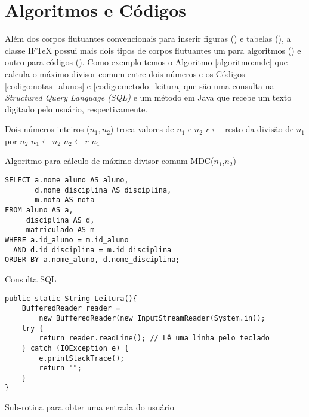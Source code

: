 \section{Algoritmos e Códigos} \label{secao:algoritmos_e_codigos}

Além dos corpos flutuantes convencionais para inserir figuras () e tabelas (), a classe {IF\TeX} possui mais dois tipos de corpos flutuantes um para algoritmos () e outro para códigos (). Como exemplo temos o Algoritmo \ref{algoritmo:mdc} que calcula o máximo divisor comum entre dois números e os Códigos \ref{codigo:notas_alunos} e \ref{codigo:metodo_leitura} que são uma consulta na \textit{Structured Query Language (SQL)} e um método em Java que recebe um texto digitado pelo usuário, respectivamente.

\begin{algoritmo}[!htb]
\begin{algorithmic}[1]
 \Require Dois números inteiros ($n_1, n_2$)
  
   \State troca valores de $n_1$ e $n_2$
 \EndIf
 \Repeat
   \State $r \leftarrow$ resto da divisão de $n_1$ por $n_2$
   \State $n_1 \leftarrow n_2$
   \State $n_2 \leftarrow r$
 \Return $n_1$
\end{algorithmic}
\caption{Algoritmo para cálculo de máximo divisor comum MDC($n_1$,$n_2$)} \label{algoritmo:mdc}
\end{algoritmo}

\begin{codigo}[!htb]
\begin{Verbatim}
SELECT a.nome_aluno AS aluno,
       d.nome_disciplina AS disciplina,
       m.nota AS nota
FROM aluno AS a,
     disciplina AS d,
     matriculado AS m
WHERE a.id_aluno = m.id_aluno
  AND d.id_disciplina = m.id_disciplina
ORDER BY a.nome_aluno, d.nome_disciplina;
\end{Verbatim}
\caption{Consulta SQL} \label{codigo:notas_alunos}
\end{codigo}

\begin{codigo}[!htb]
\begin{Verbatim}
public static String Leitura(){
    BufferedReader reader =
        new BufferedReader(new InputStreamReader(System.in));
    try {
        return reader.readLine(); // Lê uma linha pelo teclado
    } catch (IOException e) {
        e.printStackTrace();
        return "";
    }
}
\end{Verbatim}
\caption{Sub-rotina para obter uma entrada do usuário} \label{codigo:metodo_leitura}
\end{codigo}

